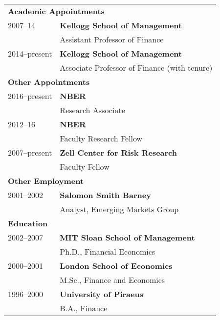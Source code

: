 \documentclass[11pt,letterpaper,serif,overlapped]{res}
\begin{document}
\begin{resume}
\begin{tabular}{ll}
\multicolumn{2}{l}{\textbf{Academic Appointments}}\\
[0.5cm]
2007--14 & \textbf{Kellogg School of Management}\\
& Assistant Professor of Finance\\
2014--present & \textbf{Kellogg School of Management}\\
& Associate Professor of Finance (with tenure)\\
[0.75cm]
\multicolumn{2}{l}{\textbf{Other Appointments}}\\
[0.5cm]
2016--present & \textbf{NBER  }\\
& Research Associate\\[0.1cm]
2012--16 & \textbf{NBER }\\
& Faculty Research Fellow\\[0.1cm]
2007--present & \textbf{Zell Center for Risk Research}\\
& Faculty Fellow  \\
[0.75cm]
\multicolumn{2}{l}{\textbf{Other Employment}}\\
[0.5cm]
2001--2002 & \textbf{Salomon Smith Barney}\\
& Analyst, Emerging Markets Group\\
[0.75cm]
\multicolumn{2}{l}{\textbf{Education}}\\
[0.5cm]
2002--2007 & \textbf{MIT Sloan School of Management}\\
& Ph.D., Financial Economics\\[0.1cm]
2000--2001 & \textbf{London School of Economics}\\
& M.Sc., Finance and Economics \\[0.1cm]
1996--2000 & \textbf{University of Piraeus} \\
& B.A., Finance\\
\end{tabular}







\newpage


\end{resume}
\end{document}
